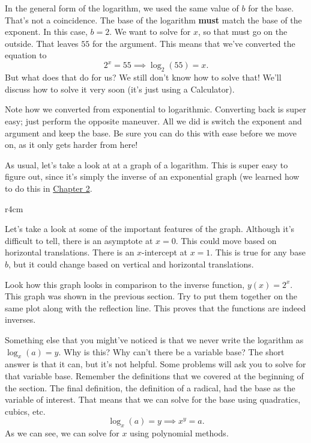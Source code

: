 \documentclass[lang=en,11pt]{elegantbook}
\begin{document}
In the general form of the logarithm, we used the same value of $b$ for the base.  That's not a coincidence.  The base of the logarithm \textbf{must} match the base of the exponent.  In this case, $b=2$.  We want to solve for $x$, so that must go on the outside.  That leaves $55$ for the argument.  This means that we've converted the equation to $$2^x=55 \implies \log_2(55)=x.$$ But what does that do for us?  We still don't know how to solve that!  We'll discuss how to solve it very soon (it's just using a Calculator).

\begin{remark}
Note how we converted from exponential to logarithmic.  Converting back is super easy; just perform the opposite maneuver.  All we did is switch the exponent and argument and keep the base.  Be sure you can do this with ease before we move on, as it only gets harder from here!
\end{remark}

As usual, let's take a look at at a graph of a logarithm.  This is super easy to figure out, since it's simply the inverse of an exponential graph (we learned how to do this in \hyperlink{chapter.2}{Chapter 2}.

\begin{wrapfigure}{r}{4cm}
\end{wrapfigure}

Let's take a look at some of the important features of the graph.  Although it's difficult to tell, there is an asymptote at $x=0$.  This could move based on horizontal translations.  There is an $x$-intercept at $x=1$.  This is true for any base $b$, but it could change based on vertical and horizontal translations.

Look how this graph looks in comparison to the inverse function, $y(x)=2^x$.  This graph was shown in the previous section.  Try to put them together on the same plot along with the reflection line.  This proves that the functions are indeed inverses.

Something else that you might've noticed is that we never write the logarithm as $\log_x(a)=y$.  Why is this?  Why can't there be a variable base?  The short answer is that it can, but it's not helpful.  Some problems will ask you to solve for that variable base.  Remember the definitions that we covered at the beginning of the section.  The final definition, the definition of a radical, had the base as the variable of interest.  That means that we can solve for the base using quadratics, cubics, etc.  $$\log_x(a)=y \implies x^y=a.$$  As we can see, we can solve for $x$ using polynomial methods.
\end{document}
